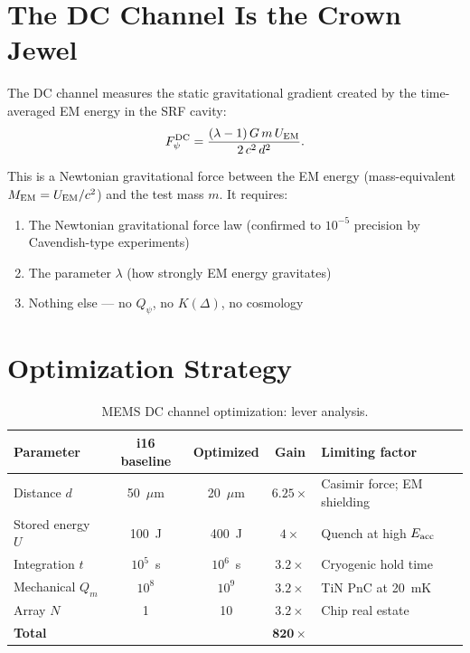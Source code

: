 \documentclass[11pt]{article}
\newcommand{\Qpsi}{Q_\psi}
\theoremstyle{definition}
\theoremstyle{remark}
\begin{document}
\section{The DC Channel Is the Crown Jewel}

The DC channel measures the static gravitational gradient created by
the time-averaged EM energy in the SRF cavity:
\begin{equation}
F_\psi^{\rm DC} = \frac{(\lambda-1)\,G\,m\,U_{\rm EM}}{2\,c^2\,d^2}.
\end{equation}

This is a Newtonian gravitational force between the EM energy
(mass-equivalent $M_{\rm EM} = U_{\rm EM}/c^2$) and the test mass $m$.
It requires:
\begin{enumerate}[nosep]
\item The Newtonian gravitational force law (confirmed to $10^{-5}$
  precision by Cavendish-type experiments)
\item The parameter $\lambda$ (how strongly EM energy gravitates)
\item Nothing else --- no $\Qpsi$, no $K(\Delta)$, no cosmology
\end{enumerate}

\section{Optimization Strategy}

\begin{table}[H]
\centering
\caption{MEMS DC channel optimization: lever analysis.}
\label{tab:mems_optimization}
\renewcommand{\arraystretch}{1.3}
\begin{tabular}{@{}p{3.5cm}cccp{4cm}@{}}
\toprule
\textbf{Parameter} & \textbf{i16 baseline} & \textbf{Optimized}
& \textbf{Gain} & \textbf{Limiting factor} \\
\midrule
Distance $d$ & 50~$\mu$m & 20~$\mu$m & $6.25\times$ &
  Casimir force; EM shielding \\
Stored energy $U$ & 100~J & 400~J & $4\times$ &
  Quench at high $E_{\rm acc}$ \\
Integration $t$ & $10^5$~s & $10^6$~s & $3.2\times$ &
  Cryogenic hold time \\
Mechanical $Q_m$ & $10^8$ & $10^9$ & $3.2\times$ &
  TiN PnC at 20~mK \\
Array $N$ & 1 & 10 & $3.2\times$ &
  Chip real estate \\
\midrule
\textbf{Total} & & & $\mathbf{820\times}$ & \\
\bottomrule
\end{tabular}
\end{table}
\end{document}
